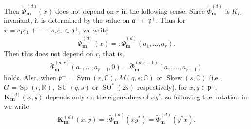 \documentclass[pdftex]{sigma}
\numberwithin{equation}{section}
\newcommand{\bK}{\mathbf{K}}
\newcommand{\bm}{\mathbf{m}}
\newcommand{\BR}{\mathbb{R}}
\newcommand{\BC}{\mathbb{C}}
\newcommand{\fa}{\mathfrak{a}}
\newcommand{\fp}{\mathfrak{p}}
\newcommand{\Sym}{\operatorname{Sym}}
\newcommand{\Skew}{\operatorname{Skew}}
\begin{document}
Then $\tilde{\Phi}_\bm^{(d)}(x)$ does not depend on $r$ in the following sense.
Since $\tilde{\Phi}_\bm^{(d)}$ is $K_L$-invariant, it is determined by the value on $\fa^+\subset\fp^+$.
Thus for $x=a_1e_1+\cdots+a_re_r\in\fa^+$, we write
\begin{gather*} \tilde{\Phi}_\bm^{(d)}(x)=:\tilde{\Phi}_\bm^{(d)}(a_1,\ldots,a_r). \end{gather*}
Then this does not depend on $r$, that is,
\begin{gather*} \tilde{\Phi}_\bm^{(d,r)}(a_1,\ldots,a_{r-1},0)=\tilde{\Phi}_\bm^{(d,r-1)}(a_1,\ldots,a_{r-1}) \end{gather*}
holds. Also, when $\fp^+=\Sym(r,\BC)$, $M(q,s;\BC)$ or $\Skew(s,\BC)$ (i.e., $G=\operatorname{Sp}(r,\BR)$, $\operatorname{SU}(q,s)$ or $\operatorname{SO}^*(2s)$ respectively),
for $x,y\in\fp^+$, $\bK_\bm^{(d)}(x,y)$ depends only on the eigenvalues of $xy^*$, so following the notation in \cite{M} we write
\begin{gather}\label{Phitilde2}
\bK_\bm^{(d)}(x,y)=:\tilde{\Phi}_\bm^{(d)}(xy^*)=\tilde{\Phi}_\bm^{(d)}(y^*x).
\end{gather}
\end{document}
